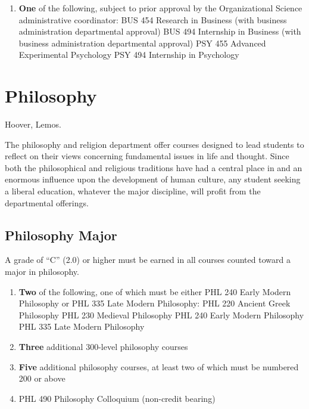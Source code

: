\documentclass[
  letterpaper,
]{scrbook}
\providecommand{\tightlist}{%
  \setlength{\itemsep}{0pt}\setlength{\parskip}{0pt}}
\begin{document}
\begin{enumerate}
\def\labelenumi{\arabic{enumi}.}
\setcounter{enumi}{3}
\tightlist
\item
  \textbf{One} of the following, subject to prior approval by the
  Organizational Science administrative coordinator: BUS 454 Research in
  Business (with business administration departmental approval) BUS 494
  Internship in Business (with business administration departmental
  approval) PSY 455 Advanced Experimental Psychology PSY 494 Internship
  in Psychology
\end{enumerate}

\hypertarget{philosophy}{%
\section{Philosophy}\label{philosophy}}

Hoover, Lemos.

The philosophy and religion department offer courses designed to lead
students to reflect on their views concerning fundamental issues in life
and thought. Since both the philosophical and religious traditions have
had a central place in and an enormous influence upon the development of
human culture, any student seeking a liberal education, whatever the
major discipline, will profit from the departmental offerings.

\hypertarget{philosophy-major}{%
\subsection{Philosophy Major}\label{philosophy-major}}

A grade of ``C'' (2.0) or higher must be earned in all courses counted
toward a major in philosophy.

\begin{enumerate}
\def\labelenumi{\arabic{enumi}.}
\item
  \textbf{Two} of the following, one of which must be either PHL 240
  Early Modern Philosophy or PHL 335 Late Modern Philosophy: PHL 220
  Ancient Greek Philosophy PHL 230 Medieval Philosophy PHL 240 Early
  Modern Philosophy PHL 335 Late Modern Philosophy
\item
  \textbf{Three} additional 300-level philosophy courses
\item
  \textbf{Five} additional philosophy courses, at least two of which
  must be numbered 200 or above
\item
  PHL 490 Philosophy Colloquium (non-credit bearing)
\end{enumerate}
\end{document}
